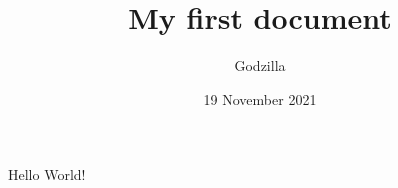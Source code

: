 \documentclass{article}
\title{My first document}
\date{19 November 2021}
\author{Godzilla}
\begin{document}
    \maketitle
    \newpage
    Hello World!
  
\end{document}
